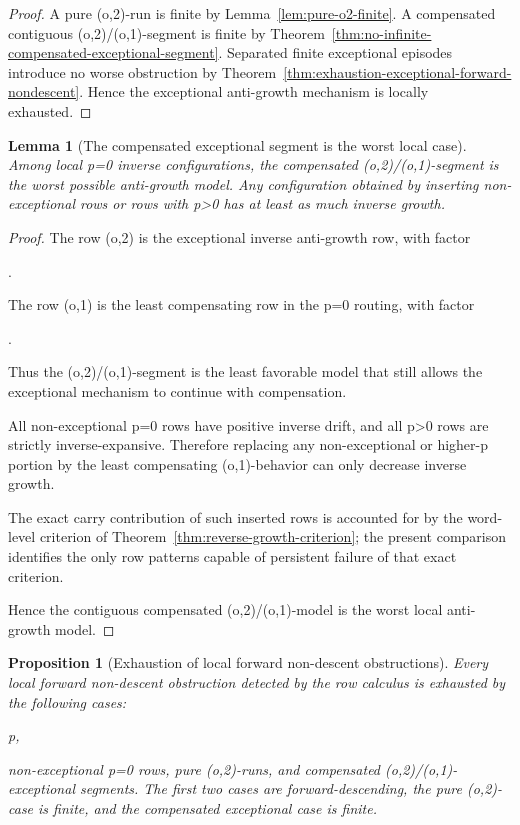 \documentclass[11pt,letterpaper]{amsart}
\def\({}%
\def\){}%
\def\[{ }%
\def\]{ }%
\theoremstyle{definition}
\theoremstyle{plain}
\newtheorem{lemma}{Lemma}
\newtheorem{proposition}{Proposition}
\theoremstyle{plain}
\theoremstyle{remark}
\begin{document}
\begin{proof}
A pure \((o,2)\)-run is finite by
Lemma~\ref{lem:pure-o2-finite}.  A compensated contiguous
\((o,2)/(o,1)\)-segment is finite by
Theorem~\ref{thm:no-infinite-compensated-exceptional-segment}.  Separated
finite exceptional episodes introduce no worse obstruction by
Theorem~\ref{thm:exhaustion-exceptional-forward-nondescent}.  Hence the
exceptional anti-growth mechanism is locally exhausted.
\end{proof}

\begin{lemma}[The compensated exceptional segment is the worst local case]
\label{lem:compensated-exceptional-worst-case}
Among local \(p=0\) inverse configurations, the compensated
\((o,2)/(o,1)\)-segment is the worst possible anti-growth model.  Any
configuration obtained by inserting non-exceptional rows or rows with
\(p>0\) has at least as much inverse growth.
\end{lemma}

\begin{proof}
The row \((o,2)\) is the exceptional inverse anti-growth row, with factor
\[
.
\]
The row \((o,1)\) is the least compensating row in the \(p=0\) routing,
with factor
\[
.
\]
Thus the \((o,2)/(o,1)\)-segment is the least favorable model that still
allows the exceptional mechanism to continue with compensation.

All non-exceptional \(p=0\) rows have positive inverse drift, and all
\(p>0\) rows are strictly inverse-expansive.  Therefore replacing any
non-exceptional or higher-\(p\) portion by the least compensating
\((o,1)\)-behavior can only decrease inverse growth.

The exact carry contribution of such inserted rows is accounted for by
the word-level criterion of Theorem~\ref{thm:reverse-growth-criterion};
the present comparison identifies the only row patterns capable of
persistent failure of that exact criterion.

Hence the
contiguous compensated \((o,2)/(o,1)\)-model is the worst local
anti-growth model.
\end{proof}

\begin{proposition}[Exhaustion of local forward non-descent obstructions]
\label{prop:exhaustion-local-forward-nondescent}
Every local forward non-descent obstruction detected by the row calculus
is exhausted by the following cases:
\[
p,
\]
non-exceptional \(p=0\) rows, pure \((o,2)\)-runs, and compensated
\((o,2)/(o,1)\)-exceptional segments.  The first two cases are
forward-descending, the pure \((o,2)\)-case is finite, and the compensated
exceptional case is finite.
\end{proposition}
\end{document}
